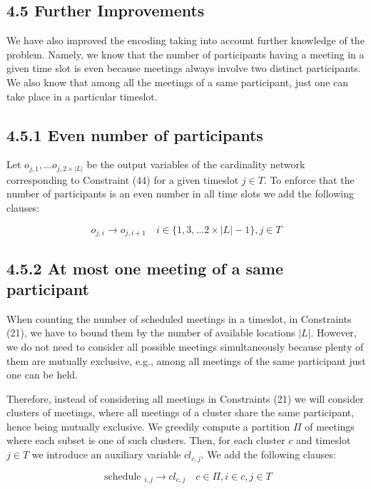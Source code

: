 \documentclass[10pt]{article}
\begin{document}
\subsection*{4.5 Further Improvements}
We have also improved the encoding taking into account further knowledge of the problem. Namely, we know that the number of participants having a meeting in a given time slot is even because meetings always involve two distinct participants. We also know that among all the meetings of a same participant, just one can take place in a particular timeslot.

\subsection*{4.5.1 Even number of participants}
Let $o_{j, 1}, \ldots o_{j, 2 \times|L|}$ be the output variables of the cardinality network corresponding to Constraint (44) for a given timeslot $j \in T$. To enforce that the number of participants is an even number in all time slots we add the following clauses:


\begin{equation*}
o_{j, i} \rightarrow o_{j, i+1} \quad i \in\{1,3, \ldots 2 \times|L|-1\}, j \in T \tag{45}
\end{equation*}


\subsection*{4.5.2 At most one meeting of a same participant}
When counting the number of scheduled meetings in a timeslot, in Constraints (21), we have to bound them by the number of available locations $|L|$. However, we do not need to consider all possible meetings simultaneously because plenty of them are mutually exclusive, e.g., among all meetings of the same participant just one can be held.

Therefore, instead of considering all meetings in Constraints (21) we will consider clusters of meetings, where all meetings of a cluster share the same participant, hence being mutually exclusive. We greedily compute a partition $\Pi$ of meetings where each subset is one of such clusters. Then, for each cluster $c$ and timeslot $j \in T$ we introduce an auxiliary variable $c l_{c, j}$. We add the following clauses:


\begin{equation*}
\text { schedule }_{i, j} \rightarrow c l_{c, j} \quad c \in \Pi, i \in c, j \in T \tag{46}
\end{equation*}
\end{document}
